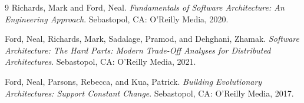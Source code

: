 \begin{thebibliography}{9}
    Richards, Mark and Ford, Neal. \emph{Fundamentals of Software Architecture: An Engineering Approach}. Sebastopol, CA: O'Reilly Media, 2020.

    Ford, Neal, Richards, Mark, Sadalage, Pramod, and Dehghani, Zhamak. \emph{Software Architecture: The Hard Parts: Modern Trade-Off Analyses for Distributed Architectures}. Sebastopol, CA: O'Reilly Media, 2021.

    Ford, Neal, Parsons, Rebecca, and Kua, Patrick. \emph{Building Evolutionary Architectures: Support Constant Change}. Sebastopol, CA: O'Reilly Media, 2017.
\end{thebibliography}
